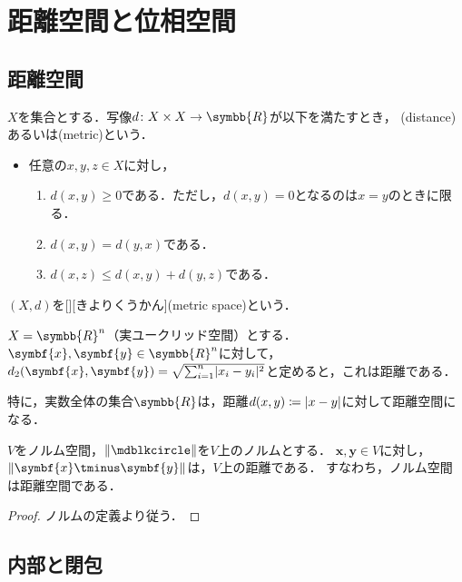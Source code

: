\documentclass[../sotsu.tex]{subfiles}
\begin{document}
\section{距離空間と位相空間}

\subsection{距離空間}

\begin{definition}[距離]
    \label{dfn:distance}
    $X$を集合とする．写像$d \colon X \times X \to \symbb{R}$が以下を満たすとき，
    (distance)あるいは(metric)という．
    \begin{itemize}
        \item 任意の$x, y, z \in X$に対し，
        \begin{enumerate}
            \item $d(x, y) \geq 0$である．ただし，$d(x, y) = 0$となるのは$x = y$のときに限る．
            \item $d(x, y) = d(y, x)$である．
            \item $d(x, z) \leq d(x, y) + d(y, z)$である．
        \end{enumerate}
    \end{itemize}
    $(X, d)$を[][きよりくうかん](metric space)という．
\end{definition}


\begin{example}
    $X = \symbb{R}^n$（実ユークリッド空間）とする．
    $\symbf{x}, \symbf{y} \in \symbb{R}^n$に対して，
    $d_2 (\symbf{x}, \symbf{y}) = \sqrt{ \sum_{i = 1}^{n} \abs{x_i - y_i}^2 }$と定めると，これは距離である．

    特に，実数全体の集合$\symbb{R}$は，距離$d(x, y) \coloneq \lvert x - y\rvert$に対して距離空間になる．
\end{example}

\begin{proposition}
    \label{thm:norm-is-distance}
    $V$をノルム空間，$\norm{\bigdot}$を$V$上のノルムとする．
    $\symbf{x}, \symbf{y} \in V$に対し，$\norm{\symbf{x} \tminus \symbf{y}}$は，$V$上の距離である．
    すなわち，ノルム空間は距離空間である．
\end{proposition}

\begin{proof}
    ノルムの定義より従う．
\end{proof}


\subsection{内部と閉包}
\end{document}
